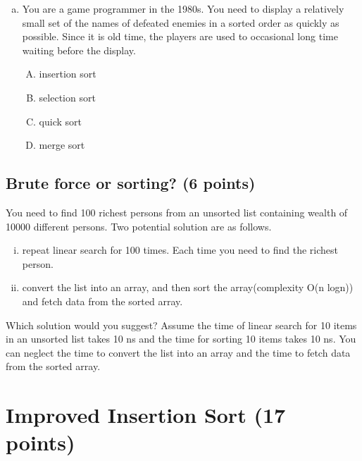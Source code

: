 \documentclass[11pt]{exam}
\begin{document}
\begin{enumerate}[(a)]
\begin{solution}
          \end{solution}

    \item You are a game programmer in the 1980s. You need to display a relatively small set of the names of defeated enemies in a sorted order as quickly as possible. Since it is old time, the players are used to occasional long time waiting before the display.
          \begin{enumerate}[A)]
              \item insertion sort
              \item selection sort
              \item quick sort
              \item merge sort
          \end{enumerate}
          \begin{solution}

          \end{solution}
\end{enumerate}

\subsection{Brute force or sorting? (6 points)}
You need to find 100 richest persons from an unsorted list containing wealth of 10000 different persons. Two potential solution are as follows.
\begin{enumerate}[i)]
    \item repeat linear search for 100 times. Each time you need to find the richest person.
    \item convert the list into an array, and then sort the array(complexity O(n logn)) and fetch data from the sorted array.
\end{enumerate}
Which solution would you suggest? Assume the time of linear search for 10 items in an unsorted list takes 10 ns and the time for sorting 10 items takes 10 ns. You can neglect the time to convert the list into an array and the time to fetch data from the sorted array.

\begin{solution}
\end{solution}

\section{Improved Insertion Sort (17 points)}
\end{document}
